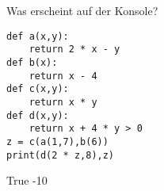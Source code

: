 \question[4] Was erscheint auf der Konsole?  
\begin{lstlisting}
def a(x,y):
    return 2 * x - y
def b(x):
    return x - 4
def c(x,y):
    return x * y
def d(x,y):
    return x + 4 * y > 0
z = c(a(1,7),b(6))
print(d(2 * z,8),z)
\end{lstlisting}
\begin{solutionbox}{1cm}
True -10
\end{solutionbox}
